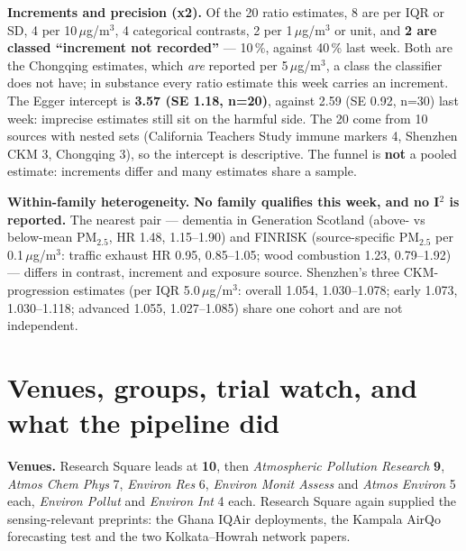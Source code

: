 \documentclass[10pt]{article}
\begin{document}
\vspace{1.5mm}
\textbf{Increments and precision (x2).} Of the 20 ratio estimates, 8 are per IQR or SD, 4 per 10\,$\mu$g/m$^3$,
4 categorical contrasts, 2 per 1\,$\mu$g/m$^3$ or unit, and \textbf{2 are classed ``increment not recorded''} ---
10\,\%, against 40\,\% last week. Both are the Chongqing estimates, which \emph{are} reported per 5\,$\mu$g/m$^3$, a
class the classifier does not have; in substance every ratio estimate this week carries an increment. The Egger
intercept is \textbf{3.57 (SE 1.18, n=20)}, against 2.59 (SE 0.92, n=30) last week: imprecise estimates still sit
on the harmful side. The 20 come from 10 sources with nested sets (California Teachers Study immune markers 4,
Shenzhen CKM 3, Chongqing 3), so the intercept is descriptive. The funnel is \textbf{not} a pooled estimate:
increments differ and many estimates share a sample.

\vspace{1.5mm}
\textbf{Within-family heterogeneity.} \textbf{No family qualifies this week, and no I$^2$ is reported.} The nearest
pair --- dementia in Generation Scotland (above- vs below-mean PM$_{2.5}$, HR 1.48, 1.15--1.90) and FINRISK
(source-specific PM$_{2.5}$ per 0.1\,$\mu$g/m$^3$: traffic exhaust HR 0.95, 0.85--1.05; wood combustion 1.23,
0.79--1.92) --- differs in contrast, increment and exposure source. Shenzhen's three CKM-progression estimates (per
IQR 5.0\,$\mu$g/m$^3$: overall 1.054, 1.030--1.078; early 1.073, 1.030--1.118; advanced 1.055, 1.027--1.085) share
one cohort and are not independent.

\vspace{4mm}

\par{}\baselineskip{}\baselineskip
\section*{\sffamily\bfseries\color{Deep}Venues, groups, trial watch, and what the pipeline did}
\vspace{-1.5mm}{\color{Teal}\rule{\linewidth}{1.1pt}}\vspace{2.5mm}

\footnotesize
\textbf{Venues.} Research Square leads at \textbf{10}, then \textit{Atmospheric Pollution Research} \textbf{9},
\textit{Atmos Chem Phys} 7, \textit{Environ Res} 6, \textit{Environ Monit Assess} and \textit{Atmos Environ} 5
each, \textit{Environ Pollut} and \textit{Environ Int} 4 each. Research Square again supplied the sensing-relevant
preprints: the Ghana IQAir deployments, the Kampala AirQo forecasting test and the two Kolkata--Howrah network papers.
\end{document}
